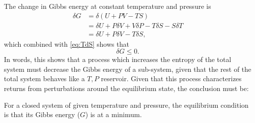 \documentclass[english]{../thermomemo/thermomemo}
\begin{document}
The change in Gibbs energy at constant temperature and pressure is 
\begin{align}
  \delta G &= \delta \left( U + PV - TS \right) \nonumber\\ 
  &= \delta U + P \delta V + V \delta P - T \delta S - S \delta T \nonumber\\
  &= \delta U + P \delta V - T \delta S,
  \label{}
\end{align}
which combined with \eqref{eq:TdS} shows that
\begin{equation}
  \delta G \leq 0.
  \label{}
\end{equation}
In words, this shows that a process which increases the entropy of the total system must decrease the Gibbs energy of a sub-system, given that the rest of the 
total system behaves like a $T,P$ reservoir. Given that this process characterizes returns from perturbations around the equilibrium state, the 
conclusion must be:
\begin{framed}
  \noindent
  For a closed system of given temperature and pressure, the equilibrium condition is that its Gibbs energy ($G$) is at a minimum. 
\end{framed}
\end{document}
